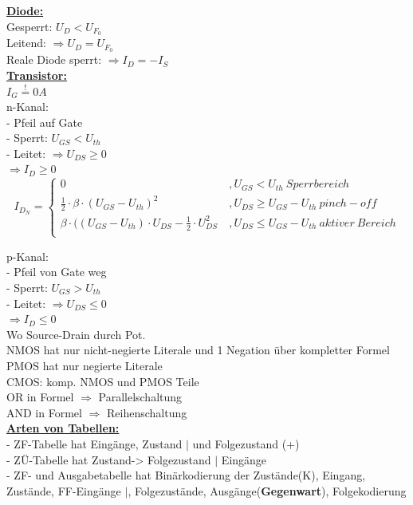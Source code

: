 \documentclass[11pt]{article}
\begin{document}
\begin{minipage}{0.33\textwidth}

\underline{\textbf{Diode:}}\\
Gesperrt: $U_D < U_{F_0}$\\
Leitend: $\Rightarrow U_D = U_{F_0}$\\
Reale Diode sperrt: $\Rightarrow I_D = -I_S$\\

\underline{\textbf{Transistor:}}\\
$I_G \stackrel{!}{=} 0A$\\

n-Kanal:\\
- Pfeil auf Gate\\
- Sperrt: $U_{GS} < U_{th}$\\
- Leitet: $\Rightarrow U_{DS} \geq 0$\\
\phantom{sssssiisssi}$\Rightarrow I_D \geq 0$\\

\[I_{D_N} = \left\{
  \begin{array}{lr}
    0 & , U_{GS} < U_{th}~Sperrbereich\\
    \frac{1}{2} \cdot \beta \cdot(U_{GS} - U_{th})^2  \ & , U_{DS} \ge U_{GS} - U_{th}~pinch-off\\
       \beta \cdot((U_{GS} - U_{th}) \cdot U_{DS} - \frac{1}{2} \cdot U_{DS}^2  \ & , U_{DS} \leq U_{GS} - U_{th}~aktiver~Bereich\\
  \end{array}
\right.
\]

p-Kanal:\\
- Pfeil von Gate weg\\
- Sperrt: $U_{GS} > U_{th}$\\
- Leitet: $\Rightarrow U_{DS} \leq 0$\\
\phantom{ssssisisssi}$\Rightarrow I_D \leq 0$\\

Wo Source-Drain durch Pot.\\
NMOS hat nur nicht-negierte Literale und 1 Negation über kompletter Formel\\
PMOS hat nur negierte Literale\\
CMOS: komp. NMOS und PMOS Teile\\
OR in Formel $\Rightarrow$ Parallelschaltung\\
AND in Formel $\Rightarrow$ Reihenschaltung\\



\underline{\textbf{Arten von Tabellen:}}\\
- ZF-Tabelle hat Eingänge, Zustand $|$ und Folgezustand (+)\\
- ZÜ-Tabelle hat Zustand-> Folgezustand $|$ Eingänge\\
- ZF- und Ausgabetabelle hat Binärkodierung der Zustände(K), Eingang, Zustände, FF-Eingänge $|$, Folgezustände, Ausgänge(\textbf{Gegenwart}), Folgekodierung
\end{minipage}
\end{document}
